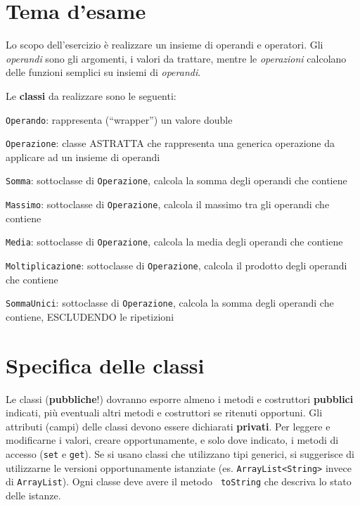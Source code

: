 \documentclass[12pt]{article}
\begin{document}
\hrulefill

\section*{Tema d'esame}

Lo scopo dell'esercizio è realizzare un insieme di operandi e operatori. Gli \textit{operandi} sono gli argomenti, i valori da trattare, mentre le \textit{operazioni} calcolano delle funzioni semplici su insiemi di \textit{operandi}. 

Le \textbf{classi} da realizzare sono le seguenti:
\medskip

\begin{compactenum}
\item \texttt{Operando}: rappresenta (``wrapper'') un valore double

\item \texttt{Operazione}: classe ASTRATTA che rappresenta una generica operazione da applicare ad un insieme di operandi

\item \texttt{Somma}: sottoclasse di \texttt{Operazione}, calcola la somma degli operandi che contiene

\item \texttt{Massimo}: sottoclasse di \texttt{Operazione}, calcola il massimo tra gli operandi che contiene

\item \texttt{Media}: sottoclasse di \texttt{Operazione}, calcola la media degli operandi che contiene

\item \texttt{Moltiplicazione}: sottoclasse di \texttt{Operazione}, calcola il prodotto degli operandi che contiene

\item \texttt{SommaUnici}: sottoclasse di \texttt{Operazione}, calcola la somma degli operandi che contiene, ESCLUDENDO le ripetizioni

\end{compactenum}

\section*{Specifica delle classi}

Le classi (\textbf{pubbliche}!) dovranno esporre almeno i metodi e costruttori \textbf{pubblici} indicati, più eventuali altri metodi e costruttori %
se ritenuti opportuni.
Gli attributi (campi) delle classi devono essere dichiarati \textbf{privati}.
Per leggere e modificarne i valori, 
creare opportunamente, e solo dove indicato, i metodi di accesso ({\tt set} e 
{\tt get}).
Se si usano classi che utilizzano tipi generici, si suggerisce  di utilizzarne 
le versioni opportunamente istanziate (es. \texttt{ArrayList<String>} invece di
\texttt{ArrayList}).
Ogni classe deve avere il metodo {\tt 
toString} che descriva lo stato delle istanze. 
\end{document}
